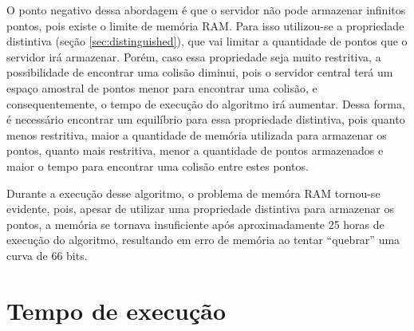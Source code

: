 O ponto negativo dessa abordagem é que o servidor não pode armazenar infinitos pontos, pois existe o limite de memória RAM. Para isso utilizou-se a propriedade distintiva (seção \ref{sec:distinguished}), que vai limitar a quantidade de pontos que o servidor irá armazenar. Porém, caso essa propriedade seja muito restritiva, a possibilidade de encontrar uma colisão diminui, pois o servidor central terá um espaço amostral de pontos menor para encontrar uma colisão, e consequentemente, o tempo de execução do algoritmo irá aumentar. Dessa forma, é necessário encontrar um equilíbrio para essa propriedade distintiva, pois quanto menos restritiva, maior a quantidade de memória utilizada para armazenar os pontos, quanto mais restritiva, menor a quantidade de pontos armazenados e maior o tempo para encontrar uma colisão entre estes pontos.

Durante a execução desse algoritmo, o problema de memóra RAM tornou-se evidente, pois, apesar de utilizar uma propriedade distintiva para armazenar os pontos, a memória se tornava insuficiente após aproximadamente 25 horas de execução do algoritmo, resultando em erro de memória ao tentar ``quebrar'' uma curva de 66 bits.

\section{Tempo de execução}
\label{sec:execution_time}

